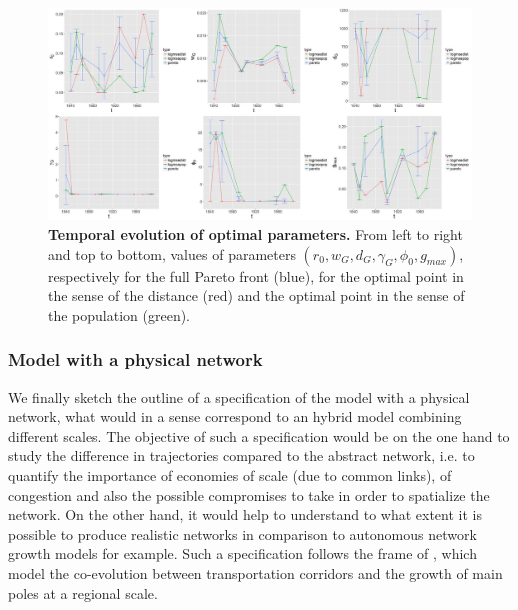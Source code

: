 \begin{figure}
	\includegraphics[width=\linewidth]{figures/6-2-3-fig-macrocoevol-parameters.jpg}
	\caption[Evolution of calibrated parameters]{\textbf{Temporal evolution of optimal parameters.} From left to right and top to bottom, values of parameters $(r_0,w_G,d_G,\gamma_G,\phi_0,g_{max})$, respectively for the full Pareto front (blue), for the optimal point in the sense of the distance (red) and the optimal point in the sense of the population (green). \label{fig:macrocoevol:parameters}}
\end{figure}


\subsubsection{Model with a physical network}


We finally sketch the outline of a specification of the model with a physical network, what would in a sense correspond to an hybrid model combining different scales. The objective of such a specification would be on the one hand to study the difference in trajectories compared to the abstract network, i.e. to quantify the importance of economies of scale (due to common links), of congestion and also the possible compromises to take in order to spatialize the network. On the other hand, it would help to understand to what extent it is possible to produce realistic networks in comparison to autonomous network growth models for example. Such a specification follows the frame of \cite{li2014modeling}, which model the co-evolution between transportation corridors and the growth of main poles at a regional scale.

